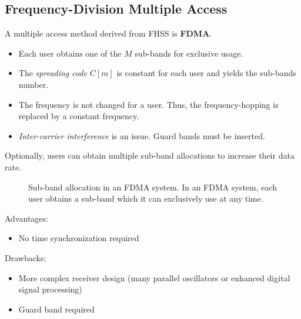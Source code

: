 \begin{refsection}
\subsection{Frequency-Division Multiple Access}

A multiple access method derived from \ac{FHSS} is  \textbf{\acf{FDMA}}.
\begin{itemize}
	\item Each user obtains one of the $M$ sub-bands for exclusive usage.
	\item The \emph{spreading code} $C[m]$ is constant for each user and yields the sub-bands number.
	\item The frequency is not changed for a user. Thus, the frequency-hopping is replaced by a constant frequency.
	\item \emph{Inter-carrier interference} is an issue. Guard bands must be inserted.
\end{itemize}

\begin{remark}
	Optionally, users can obtain multiple sub-band allocations to increase their data rate.
\end{remark}

\begin{figure}[H]
	\centering
	\caption[Sub-band allocation in an \acs{FDMA} system]{Sub-band allocation in an \acs{FDMA} system. In an \acs{FDMA} system, each user obtains a sub-band which it can exclusively use at any time.}
\end{figure}

Advantages:
\begin{itemize}
	\item No time synchronization required
\end{itemize}

Drawbacks:
\begin{itemize}
	\item More complex receiver design (many parallel oscillators or enhanced digital signal processing)
	\item Guard band required
\end{itemize}


\end{refsection}
